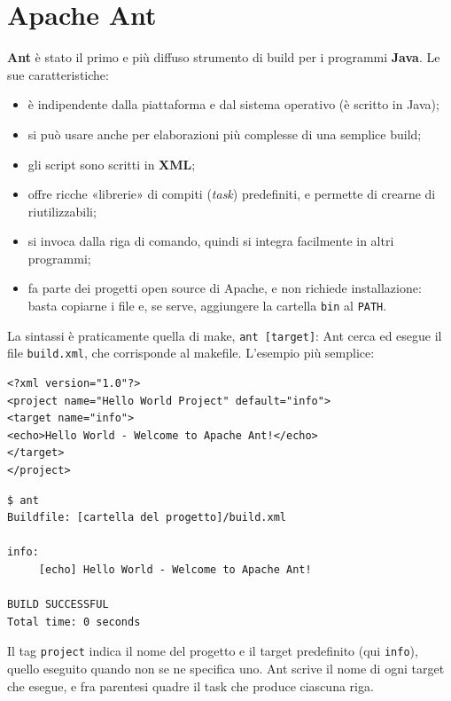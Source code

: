 \section{Apache Ant}

\textbf{Ant} è stato il primo e più diffuso strumento di build per i programmi \textbf{Java}. Le sue caratteristiche:

\begin{itemize}
  \item è indipendente dalla piattaforma e dal sistema operativo (è scritto in Java);
  \item si può usare anche per elaborazioni più complesse di una semplice build;
  \item gli script sono scritti in \textbf{XML};
  \item offre ricche «librerie» di compiti (\textit{task}) predefiniti, e permette di crearne di riutilizzabili;
  \item si invoca dalla riga di comando, quindi si integra facilmente in altri programmi;
  \item fa parte dei progetti open source di Apache, e non richiede installazione: basta copiarne i file e, se serve,
        aggiungere la cartella \texttt{bin} al \texttt{PATH}.
\end{itemize}

La sintassi è praticamente quella di make, \texttt{ant [target]}: Ant cerca ed esegue il file \texttt{build.xml}, che
corrisponde al makefile. L'esempio più semplice:

\begin{lstlisting}[style=xml, name=build.xml]
<?xml version="1.0"?>
<project name="Hello World Project" default="info">
<target name="info">
<echo>Hello World - Welcome to Apache Ant!</echo>
</target>
</project>
\end{lstlisting}

\begin{lstlisting}[style=shell, name=Terminale]
$ ant
Buildfile: [cartella del progetto]/build.xml

info:
     [echo] Hello World - Welcome to Apache Ant!

BUILD SUCCESSFUL
Total time: 0 seconds
\end{lstlisting}

Il tag \texttt{project} indica il nome del progetto e il target predefinito (qui \texttt{info}), quello eseguito quando
non se ne specifica uno. Ant scrive il nome di ogni target che esegue, e fra parentesi quadre il task che produce
ciascuna riga.


